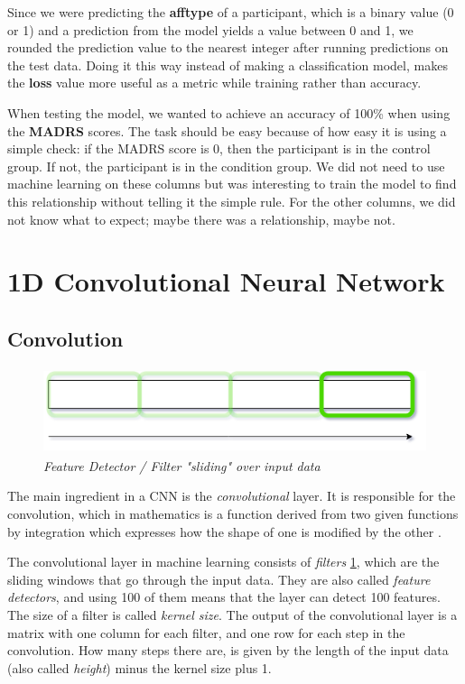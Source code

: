 Since we were predicting the \textbf{afftype} of a participant, which is a binary value (0 or 1) and a prediction from the model yields a value between 0 and 1, we rounded the prediction value to the nearest integer after running predictions on the test data. Doing it this way instead of making a classification model, makes the \textbf{loss} value more useful as a metric while training rather than accuracy. 

When testing the model, we wanted to achieve an accuracy of 100\% when using the \textbf{MADRS} scores. The task should be easy because of how easy it is using a simple check: if the MADRS score is 0, then the participant is in the control group. If not, the participant is in the condition group. We did not need to use machine learning on these columns but was interesting to train the model to find this relationship without telling it the simple rule. For the other columns, we did not know what to expect; maybe there was a relationship, maybe not.

\section{1D Convolutional Neural Network}

\subsection{Convolution}

\begin{figure}[h]
\begin{center}
    \includegraphics[height=2.5cm]{img/feature_detector.png}
    \caption{\textit{Feature Detector / Filter "sliding" over input data}}
    \label{figure:feature_detector}
\end{center}
\end{figure}

\noindent The main ingredient in a CNN is the \textit{convolutional} layer. It is responsible for the convolution, which in mathematics is a function derived from two given functions by integration which expresses how the shape of one is modified by the other \cite{convolution_definition}. 

The convolutional layer in machine learning consists of \textit{filters} \ref{figure:feature_detector}, which are the sliding windows that go through the input data.  They are also called \textit{feature detectors}, and using 100 of them means that the layer can detect 100 features. The size of a filter is called \textit{kernel size}. The output of the convolutional layer is a matrix with one column for each filter, and one row for each step in the convolution. How many steps there are, is given by the length of the input data (also called \textit{height}) minus the kernel size plus 1.

